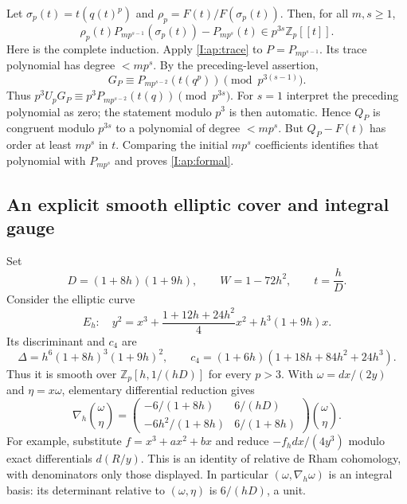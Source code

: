 \documentclass[11pt,letterpaper]{article}
\theoremstyle{definition}
\theoremstyle{remark}
\begin{document}
Let $\sigma_p(t)=t(q(t)^p)$ and $\rho_p=F(t)/F(\sigma_p(t))$.
Then, for all $m,s\geq1$,
\begin{equation}\label{I:ap:formal}
 \rho_p(t)P_{mp^{s-1}}(\sigma_p(t))-P_{mp^s}(t)
 \in p^{3s}\mathbb Z_p[[t]].
\end{equation}
Here is the complete induction. Apply \eqref{I:ap:trace} to
$P=P_{mp^{s-1}}$. Its trace polynomial has degree $<mp^s$.
By the preceding-level assertion,
\[
 G_P\equiv P_{mp^{s-2}}(t(q^p))\pmod{p^{3(s-1)}}.
\]
Thus $p^3U_pG_P\equiv p^3P_{mp^{s-2}}(t(q))\pmod{p^{3s}}$.
For $s=1$ interpret the preceding polynomial as zero; the statement
modulo $p^3$ is then automatic. Hence $Q_P$ is congruent modulo $p^{3s}$
to a polynomial of degree $<mp^s$. But $Q_P-F(t)$ has order at least
$mp^s$ in $t$. Comparing the initial $mp^s$ coefficients identifies that
polynomial with $P_{mp^s}$ and proves \eqref{I:ap:formal}.

\subsection{An explicit smooth elliptic cover and integral gauge}

Set
\[
 D=(1+8h)(1+9h),\qquad W=1-72h^2,\qquad t=\frac hD.
\]
Consider the elliptic curve
\begin{equation}\label{I:ap:elliptic}
 E_h:\quad y^2=x^3+\frac{1+12h+24h^2}{4}x^2+h^3(1+9h)x.
\end{equation}
Its discriminant and $c_4$ are
\[
 \Delta=h^6(1+8h)^3(1+9h)^2,\qquad
 c_4=(1+6h)(1+18h+84h^2+24h^3).
\]
Thus it is smooth over $\mathbb Z_p[h,1/(hD)]$ for every $p>3$.
With $\omega=dx/(2y)$ and $\eta=x\omega$, elementary differential
reduction gives
\begin{equation}\label{I:ap:GM}
 \nabla_h\binom\omega\eta=
 \begin{pmatrix}
 -6/(1+8h)&6/(hD)\\
 -6h^2/(1+8h)&6/(1+8h)
 \end{pmatrix}\binom\omega\eta.
\end{equation}
For example, substitute $f=x^3+ax^2+bx$ and reduce
$-f_h dx/(4y^3)$ modulo exact differentials $d(R/y)$. This is an
identity of relative de Rham cohomology, with denominators only those
displayed. In particular $(\omega,\nabla_h\omega)$ is an integral basis:
its determinant relative to $(\omega,\eta)$ is $6/(hD)$, a unit.
\end{document}
